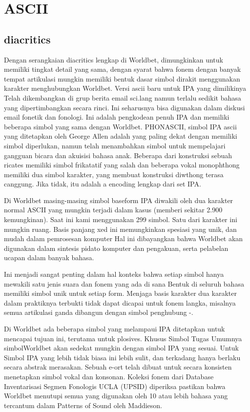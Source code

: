 \section{ASCII}
	\subsection{diacritics}
	Dengan serangkaian diacritics lengkap di Worldbet, dimungkinkan untuk memiliki tingkat detail yang sama,
dengan syarat bahwa fonem dengan banyak tempat artikulasi mungkin memiliki bentuk dasar
simbol dirakit menggunakan karakter menghubungkan Worldbet. Versi ascii baru untuk IPA yang dimilikinya
Telah dikembangkan di grup berita email sci.lang namun terlalu sedikit bahasa yang dipertimbangkan secara rinci. Ini seharusnya bisa digunakan dalam diskusi email
fonetik dan fonologi. Ini adalah pengkodean penuh IPA dan memiliki beberapa simbol yang sama dengan
Worldbet.
PHONASCII, simbol IPA ascii yang ditetapkan oleh George Allen adalah yang paling dekat dengan memiliki simbol
diperlukan, namun telah menambahkan simbol untuk mempelajari gangguan bicara dan akuisisi bahasa anak. Beberapa
dari konstruksi sebuah ricates memiliki simbol frikatatif yang salah dan beberapa vokal monophthong
memiliki dua simbol karakter, yang membuat konstruksi diwthong terasa canggung. Jika tidak, itu adalah a
encoding lengkap dari set IPA.

	Di Worldbet masing-masing simbol baseform IPA diwakili oleh dua karakter normal ASCII yang
mungkin terjadi dalam kasus (memberi sekitar 2.900 kemungkinan). Saat ini kami menggunakan 299 simbol. Satu dari
karakter ini mungkin ruang. Basis panjang xed ini memungkinkan spesiasi yang unik, dan mudah
dalam pemrosesan komputer Hal ini dibayangkan bahwa Worldbet akan digunakan dalam sintesis pidato komputer dan
pengakuan, serta pelabelan ucapan dalam banyak bahasa.

Ini menjadi sangat penting dalam hal konteks bahwa setiap simbol hanya mewakili satu jenis suara dan fonem yang ada di sana
Bentuk di seluruh bahasa memiliki simbol unik untuk setiap form. Menjaga basis karakter dua karakter
dalam praktiknya terbukti tidak dapat dicapai untuk fonem langka, misalnya semua artikulasi ganda
dibangun dengan simbol penghubung -. 

Di Worldbet ada beberapa simbol yang melampaui IPA ditetapkan untuk mencapai tujuan ini, terutama untuk plosives.
Khusus Simbol Tugas Umumnya simbolWorldbet akan sedekat mungkin dengan simbol IPA yang sesuai. Untuk
Simbol IPA yang lebih tidak biasa ini lebih sulit, dan terkadang hanya berlaku secara abstrak
merasakan. Sebuah e-ort telah dibuat untuk secara konsisten menetapkan simbol vokal dan konsonan. Koleksi
fonem dari Database Inventarisasi Segmen Fonologis UCLA (UPSID) diperiksa
pastikan bahwa Worldbet menutupi semua yang digunakan oleh 10 atau lebih bahasa yang tercantum dalam Patterns of Sound
oleh Maddieson.

